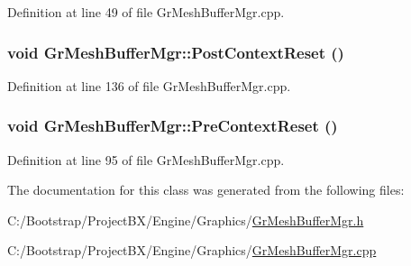 Definition at line 49 of file GrMeshBufferMgr.cpp.\hypertarget{class_gr_mesh_buffer_mgr_586bd053976b8b8a4836321bf4f68eef}{
\subsubsection[{PostContextReset}]{\setlength{\rightskip}{0pt plus 5cm}void GrMeshBufferMgr::PostContextReset ()}}
\label{class_gr_mesh_buffer_mgr_586bd053976b8b8a4836321bf4f68eef}




Definition at line 136 of file GrMeshBufferMgr.cpp.\hypertarget{class_gr_mesh_buffer_mgr_497eace30ff7d4e24e43627ec3e8aab5}{
\subsubsection[{PreContextReset}]{\setlength{\rightskip}{0pt plus 5cm}void GrMeshBufferMgr::PreContextReset ()}}
\label{class_gr_mesh_buffer_mgr_497eace30ff7d4e24e43627ec3e8aab5}




Definition at line 95 of file GrMeshBufferMgr.cpp.

The documentation for this class was generated from the following files:\begin{CompactItemize}
\item 
C:/Bootstrap/ProjectBX/Engine/Graphics/\hyperlink{_gr_mesh_buffer_mgr_8h}{GrMeshBufferMgr.h}\item 
C:/Bootstrap/ProjectBX/Engine/Graphics/\hyperlink{_gr_mesh_buffer_mgr_8cpp}{GrMeshBufferMgr.cpp}\end{CompactItemize}
